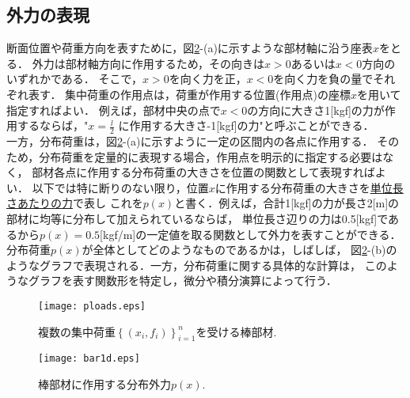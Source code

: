 \documentclass[10pt,a4j]{jbook}
\begin{document}
\subsection{外力の表現}
\hspace{\parindent}
断面位置や荷重方向を表すために，図\ref{fig:fig0}-(a)に示すような部材軸に沿う座表$x$をとる．
外力は部材軸方向に作用するため，その向きは$x>0$あるいは$x<0$方向のいずれかである．
そこで，$x>0$を向く力を正，$x<0$を向く力を負の量でそれぞれ表す．
集中荷重の作用点は，荷重が作用する位置(作用点)の座標$x$を用いて指定すればよい．
例えば，部材中央の点で$x<0$の方向に大きさ1[kgf]の力が作用するならば，"$x=\frac{l}{2}$
に作用する大きさ-1[kgf]の力"と呼ぶことができる．\\
一方，分布荷重は，図\ref{fig:fig0}-(a)に示すように一定の区間内の各点に作用する．
そのため，分布荷重を定量的に表現する場合，作用点を明示的に指定する必要はなく，
部材各点に作用する分布荷重の大きさを位置の関数として表現すればよい．
以下では特に断りのない限り，位置$x$に作用する分布荷重の大きさを\underline{単位長さあたりの力}で表し
これを$p(x)$と書く．例えば，合計1[kgf]の力が長さ2[m]の部材に均等に分布して加えられているならば，
単位長さ辺りの力は0.5[kgf]であるから$p(x)=0.5$[kgf/m]の一定値を取る関数として外力を表すことができる．
分布荷重$p(x)$が全体としてどのようなものであるかは，しばしば，
図\ref{fig:fig0}-(b)のようなグラフで表現される．一方，分布荷重に関する具体的な計算は，
このようなグラフを表す関数形を特定し，微分や積分演算によって行う．
\begin{figure}[h]
	\begin{center}
	\texttt{[image: ploads.eps]} 
	\end{center}
	\caption{複数の集中荷重$\left\{(x_i,f_i)\right\}_{i=1}^n$を受ける棒部材.} 
	\label{fig:ploads}
\end{figure}
\begin{figure}[h]
	\begin{center}
	\texttt{[image: bar1d.eps]} 
	\end{center}
	\caption{棒部材に作用する分布外力$p(x)$.} 
	\label{fig:fig0}
\end{figure}
\end{document}
